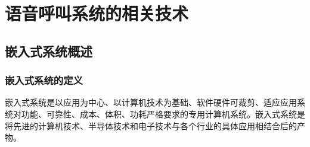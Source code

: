 
\chapter{语音呼叫系统的相关技术}

\section{嵌入式系统概述}
\subsection{嵌入式系统的定义}
嵌入式系统是以应用为中心、以计算机技术为基础、软件硬件可裁剪、适应应用系统对功能、可靠性、成本、体积、功耗严格要求的专用计算机系统。嵌入式系统是将先进的计算机技术、半导体技术和电子技术与各个行业的具体应用相结合后的产物。


